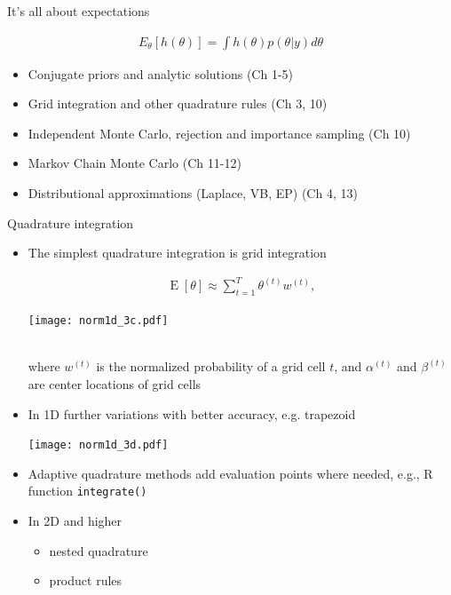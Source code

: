\documentclass[english,t]{beamer}
\DeclareMathOperator{\E}{E}
\begin{document}
 \begin{frame}
   
  {\Large\color{navyblue} It's all about expectations}

   \begin{align*}
   E_{\theta}[h(\theta)] = \int h(\theta) p(\theta|y) d\theta
   \end{align*}

  \begin{itemize}
  \item Conjugate priors and analytic solutions (Ch 1-5)
  \item Grid integration and other quadrature rules (Ch 3, 10)
  \item Independent Monte Carlo, rejection and importance sampling (Ch 10)
  \item Markov Chain Monte Carlo (Ch 11-12)
  \item {\color{gray}Distributional approximations (Laplace, VB, EP) (Ch 4, 13)}
  \end{itemize}
   

 \end{frame}


\begin{frame}
   
  {\Large\color{navyblue} Quadrature integration}

  \begin{itemize}
  \item The simplest quadrature integration is grid integration\\
    \hspace{0cm}\begin{minipage}{3.5cm}
    \begin{align*}
      \E[\theta] \approx \sum_{t=1}^{T} \theta^{(t)}w^{(t)} ,
    \end{align*}
  \end{minipage}
  \begin{minipage}{6cm}
  \texttt{[image: norm1d\_3c.pdf]}
\end{minipage}\\
where $w^{(t)}$ is the normalized probability of a grid cell $t$, and $\alpha^{(t)}$ and $\beta^{(t)}$ are center locations of grid cells
\item<2-> In 1D further variations with better accuracy, e.g. trapezoid
  \begin{center}
    \texttt{[image: norm1d\_3d.pdf]}
  \end{center}
  \vspace{-0.7\baselineskip}
\item<3-> Adaptive quadrature methods add evaluation points where needed{\color{gray}, e.g., R function \texttt{integrate()}}
\item<4-> In 2D and higher
  \begin{itemize}
  \item nested quadrature
  \item product rules
  \end{itemize}
  \end{itemize}
  

\end{frame}
\end{document}
